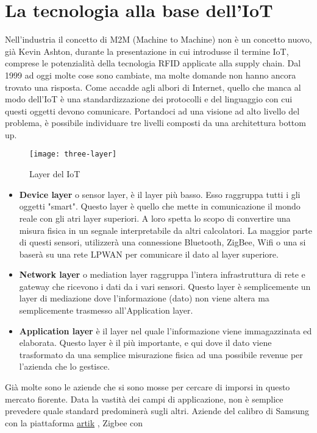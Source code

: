 \section{La tecnologia alla base dell'IoT} 
Nell'industria il concetto di M2M (Machine to Machine) non è un concetto nuovo,
già Kevin Ashton, durante la presentazione in cui introdusse il termine IoT,
comprese le potenzialità della tecnologia RFID applicate alla supply chain. Dal
1999 ad oggi molte cose sono cambiate, ma molte domande non hanno ancora trovato
una risposta. Come accadde agli albori di Internet, quello che manca al modo
dell'IoT è una standardizzazione dei protocolli e del linguaggio con cui questi
oggetti devono comunicare. Portandoci ad una visione ad alto livello del
problema, è possibile individuare tre livelli composti da una architettura
bottom up.
\begin{figure}[h]
        \centering 
                \texttt{[image: three-layer]}
        \caption{Layer del IoT}
\end{figure}
\begin{itemize}
\item \textbf{Device layer} o sensor layer, è il layer più basso. Esso raggruppa
tutti i gli oggetti "smart". Questo layer è quello che mette in comunicazione il
mondo reale con gli atri layer superiori. A loro spetta lo scopo di convertire
una misura fisica in un segnale interpretabile da altri calcolatori.
La maggior parte di questi sensori, utilizzerà una connessione Bluetooth,
ZigBee, Wifi o una si baserà su una rete LPWAN per comunicare il dato al layer
superiore.
\item \textbf{Network layer} o mediation layer raggruppa l'intera infrastruttura
di rete e gateway che ricevono i dati da i vari sensori. Questo layer è
semplicemente un layer di mediazione dove l'informazione (dato) non viene altera
ma semplicemente trasmesso all'Application layer.
\item \textbf{Application layer} è il layer nel quale l'informazione viene
immagazzinata ed elaborata. Questo layer è il più importante, e qui dove il dato
viene trasformato da una semplice misurazione fisica ad una possibile revenue
per l'azienda che lo gestisce.
\end{itemize}
Già molte sono le aziende che si sono mosse per cercare di imporsi in questo
mercato fiorente. Data la vastità dei campi di applicazione, non è semplice
prevedere quale standard predominerà sugli altri.
Aziende del calibro di Samsung con la
piattaforma \href{https://www.artik.io}{artik}  , Zigbee con
